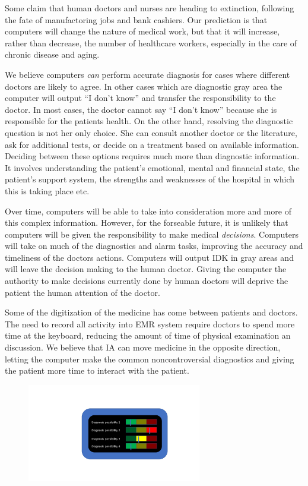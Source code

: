 \documentclass[11pt]{article}
\begin{document}
  Some claim that human doctors and nurses are heading to extinction,
  following the fate of manufactoring jobs and bank cashiers.  Our prediction is
  that computers will change the nature of medical work, but that it
  will increase, rather than decrease, the number of healthcare
  workers, especially in the care of chronic disease and aging.

  We believe computers {\em can} perform accurate diagnosis for cases where
  different doctors are likely to agree. In other cases which are
  diagnostic gray area the computer will output ``I don't know'' and
  transfer the responsibility to the doctor. In most cases, the doctor
  cannot say ``I don't know'' because she is responsible for the
  patients health. On the other hand, resolving the diagnostic
  question is not her only choice. She can consult another doctor or
  the literature, ask for additional tests, or decide on a treatment
  based on available information. Deciding between these options requires much
  more than diagnostic information. It involves understanding the
  patient's emotional, mental and financial state, the patient's
  support system, the strengths and weaknesses of the hospital in
  which this is taking place etc.

  Over time, computers will be able to take into consideration more
  and more of this complex information. However, for the forseable
  future, it is unlikely that computers will be given the
  responsibility to make medical {\em decisions}. Computers
  will take on much of the diagnostics and alarm tasks, improving the
  accuracy and timeliness of the doctors actions. Computers will
  output IDK in gray areas and will leave the decision making to the
  human doctor. Giving the computer the authority to make decisions
  currently done by human doctors will deprive the patient the human
  attention of the doctor.

  Some of the digitization of the medicine has come between patients
  and doctors. The need to record all activity into EMR system require
  doctors to spend more time at the keyboard, reducing the amount of
  time of physical examination an discussion. We believe that IA can
  move medicine in the opposite direction, letting the computer make
  the common noncontroversial diagnostics and giving the patient more
  time to interact with the patient.

\begin{figure}[h]
\begin{center}
\includegraphics[width=3in]{figures/RedYellowGreen.pdf}
\end{center}
\end{figure}
\end{document}
